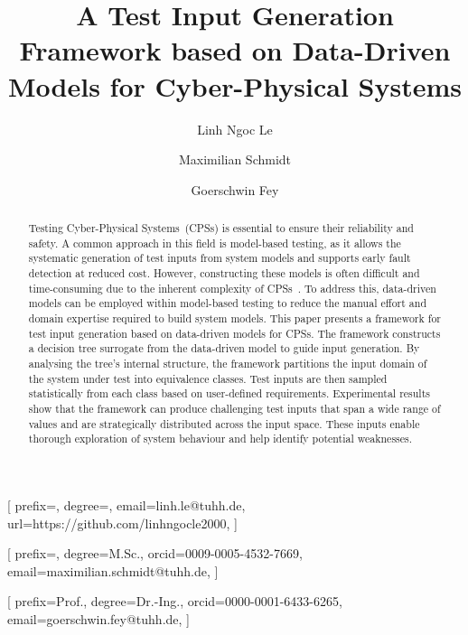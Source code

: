 \documentclass[
]{ceurart}
\theoremstyle{definition}
\begin{document}





\title{A Test Input Generation Framework based on Data-Driven Models for Cyber-Physical Systems}


\author[1]{Linh Ngoc Le}[%
prefix=,
degree=,
email=linh.le@tuhh.de,
url=https://github.com/linhngocle2000,
]


\author[1]{Maximilian Schmidt}[%
prefix=,
degree=M.Sc.,
orcid=0009-0005-4532-7669,
email=maximilian.schmidt@tuhh.de,
]

\author[1]{Goerschwin Fey}[%
prefix=Prof.,
degree=Dr.-Ing.,
orcid=0000-0001-6433-6265,
email=goerschwin.fey@tuhh.de,
]
\address[1]{Hamburg University of Technology, Hamburg, Germany}


\begin{abstract}
Testing Cyber-Physical Systems~(CPSs) is essential to ensure their reliability and safety. A common approach in this field is model-based testing, as it allows the systematic generation of test inputs from system models and supports early fault detection at reduced cost. However, constructing these models is often difficult and time-consuming due to the inherent complexity of CPSs~\cite{flowcean}. To address this, data-driven models can be employed within model-based testing to reduce the manual effort and domain expertise required to build system models. This paper presents a framework for test input generation based on data-driven models for CPSs. The framework constructs a decision tree surrogate from the data-driven model to guide input generation. By analysing the tree’s internal structure, the framework partitions the input domain of the system under test into equivalence classes. Test inputs are then sampled statistically from each class based on user-defined requirements. Experimental results show that the framework can produce challenging test inputs that span a wide range of values and are strategically distributed across the input space. These inputs enable thorough exploration of system behaviour and help identify potential weaknesses.
\end{abstract}
\end{document}
